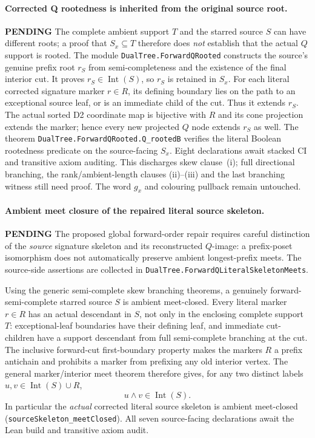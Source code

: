 \documentclass[11pt]{article}
\newcommand{\todo}{\textcolor{gray!70!black}{\textbf{PENDING}}}
\newcommand{\lean}[1]{\texttt{#1}}
\begin{document}
\paragraph{Corrected Q rootedness is inherited from the original source root.} \todo
The complete ambient support $T$ and the
starred source $S$ can have different roots;
a proof that $S_x\subseteq T$ therefore
does \emph{not} establish that the actual
$Q$ support is rooted.
The module \lean{DualTree.ForwardQRooted}
constructs the source's genuine prefix
root $r_S$ from semi-completeness and
the existence of the final interior cut.
It proves $r_S\in\operatorname{Int}(S)$,
so $r_S$ is retained in $S_x$.
For each literal corrected signature
marker $r\in R$, its defining boundary
lies on the path to an exceptional
source leaf, or is an immediate child
of the cut. Thus it extends $r_S$.
The actual sorted D2 coordinate map
is bijective with $R$ and its cone
projection extends the marker; hence
every new projected $Q$ node extends
$r_S$ as well.
The theorem
\lean{DualTree.ForwardQRooted.Q_rootedB}
verifies the literal Boolean rootedness
predicate on the source-facing $S_x$.
Eight declarations await stacked CI
and transitive axiom auditing.
This discharges skew clause~(i);
full directional branching, the
rank/ambient-length clauses (ii)--(iii)
and the last branching witness still
need proof. The word $g_x$ and
colouring pullback remain untouched.

\paragraph{Ambient meet closure of the repaired literal source skeleton.} \todo
The proposed global forward-order repair requires
careful distinction of the \emph{source}
signature skeleton and its reconstructed
$Q$-image: a prefix-poset isomorphism does not
automatically preserve ambient longest-prefix
meets. The source-side assertions are collected
in \lean{DualTree.ForwardQLiteralSkeletonMeets}.

Using the generic semi-complete skew branching
theorems, a genuinely forward-semi-complete
starred source $S$ is ambient meet-closed.
Every literal marker $r\in R$ has an
actual descendant in $S$, not only in
the enclosing complete support $T$:
exceptional-leaf boundaries have their
defining leaf, and immediate cut-children
have a support descendant from full
semi-complete branching at the cut.
The inclusive forward-cut first-boundary
property makes the markers $R$ a prefix
antichain and prohibits a marker from
prefixing any old interior vertex.
The general marker/interior meet theorem
therefore gives, for any two distinct
labels $u,v\in\operatorname{Int}(S)\cup R$,
\[
 u\wedge v\in\operatorname{Int}(S).
\]
In particular the \emph{actual} corrected
literal source skeleton is ambient meet-closed
(\lean{sourceSkeleton_meetClosed}).
All seven source-facing declarations await
the Lean build and transitive axiom audit.
\end{document}
